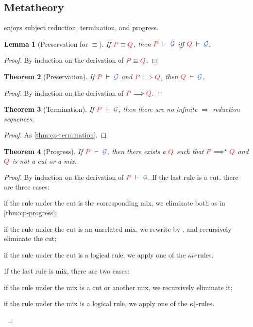 \documentclass[submission,copyright,creativecommons]{eptcs}
\newtheorem{lemma}{Lemma}[section]
\newtheorem{theorem}[lemma]{Theorem}
\begin{document}
\subsection{Metatheory}
\hcp enjoys subject reduction, termination, and progress.
\begin{lemma}[Preservation for $\equiv$]\label{lem:hcp-preservation-equiv}
  If $\tm{P}\equiv\tm{Q}$, then $\seq[P]{\mathcal{G}}$ iff $\seq[Q]{\mathcal{G}}$.
\end{lemma} 
\begin{proof}
  By induction on the derivation of $\tm{P}\equiv\tm{Q}$.
\end{proof}%
\begin{theorem}[Preservation]\label{thm:hcp-preservation}
  If $\seq[P]{\mathcal{G}}$ and $\reducesto{P}{Q}$, then $\seq[Q]{\mathcal{G}}$.
\end{theorem} 
\begin{proof}
  By induction on the derivation of $\reducesto{P}{Q}$.
\end{proof}%
\begin{theorem}[Termination]\label{thm:hcp-termination}
  If $\seq[P]{\mathcal{G}}$, then there are no infinite $\Longrightarrow$-reduction sequences.
\end{theorem} 
\begin{proof}
  As \cref{thm:cp-termination}.
\end{proof}
\begin{theorem}[Progress]\label{thm:hcp-progress}
  If $\seq[P]{\mathcal{G}}$, then there exists a $\tm{Q}$ such that
  $\tm{P}\Longrightarrow^\star\tm{Q}$ and $\tm{Q}$ is not a cut or a mix.
\end{theorem} 
\begin{proof}
  By induction on the derivation of $\seq[P]{\mathcal{G}}$. If the last rule is a cut, there are three cases:
  \begin{enumerate*}[label={\alph*)}]
  \item
    if the rule under the cut is the corresponding mix, we eliminate both as in
    \cref{thm:cp-progress};
  \item
    if the rule under the cut is an unrelated mix, we rewrite by \hccpEquivScopeExt{}, and recursively eliminate the cut;
  \item
    if the rule under the cut is a logical rule, we apply one of the $\kappa\nu$-rules.
  \end{enumerate*}
  If the last rule is mix, there are two cases:
  \begin{enumerate*}[label={\alph*)}]
  \item
    if the rule under the mix is a cut or another mix, we recursively eliminate it;
  \item
    if the rule under the mix is a logical rule, we apply one of the
    $\kappa{\ensuremath{\mid}}$-rules.
  \end{enumerate*}
\end{proof}%
\end{document}
